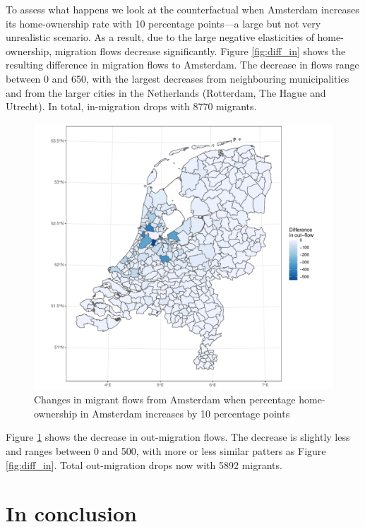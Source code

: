 \documentclass[fleqn,10pt]{SelfArx} %
\begin{document}
{{To assess what happens we look at the counterfactual when Amsterdam increases
its home-ownership rate with 10 percentage points---a large but not very
unrealistic scenario.  As a result, due to the large negative elasticities of
home-ownership, migration flows decrease significantly. Figure \ref{fig:diff_in}
shows the resulting difference in migration flows to Amsterdam.  The decrease in
flows range between 0 and 650, with the largest decreases from neighbouring
municipalities and from the larger cities in the Netherlands (Rotterdam, The
Hague and Utrecht). In total, in-migration drops with 8770 migrants.

\begin{figure}
  \centering \includegraphics[width =
  \columnwidth]{../fig/p_diff_out.pdf}
  \caption{Changes in migrant flows from Amsterdam when percentage home-ownership
    in Amsterdam increases by 10  percentage points}\label{fig:diff_out}
\end{figure}

Figure \ref{fig:diff_out} shows the decrease in out-migration flows. The
decrease is slightly less and ranges between 0 and 500, with more or less
similar patters as Figure \ref{fig:diff_in}. Total out-migration drops now with
5892 migrants.

\section{In conclusion}

}}
\end{document}
